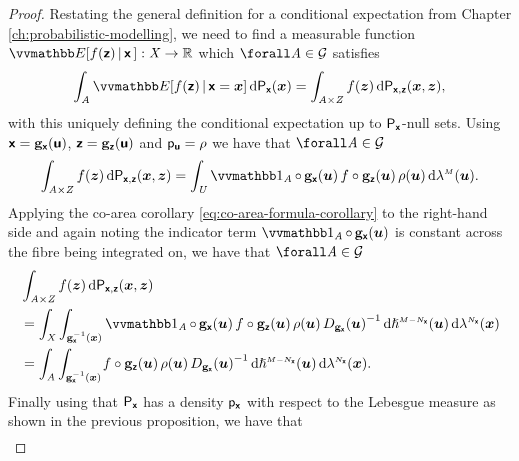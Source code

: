 \begin{proof}
Restating the general definition for a conditional expectation from Chapter \ref{ch:probabilistic-modelling}, we need to find a measurable function $\expc{f(\rvct{z}) \gvn \rvct{x}\,} : \set{X} \to \reals$ which $\forall\set{A} \in \sset{G}$ satisfies
\begin{equation*}
  \int_{\set{A}}
    \expc{f(\rvct{z}) \gvn \rvct{x} = \vct{x}} 
  \,\dr\prob{\rvct{x}}(\vct{x}) =
  \int_{\set{A} \times \set{Z}}
    f(\vct{z}) 
  \,\dr\prob{\rvct{x},\rvct{z}}(\vct{x},\vct{z}),
\end{equation*}
with this uniquely defining the conditional expectation up to $\mathsf{P}_{\boldsymbol{\mathsf{x}}}$-null sets. Using $\boldsymbol{\mathsf{x}} = {\mathbf{g}}_{\boldsymbol{\mathsf{x}}}(\boldsymbol{\mathsf{u}})$, $\boldsymbol{\mathsf{z}} = {\mathbf{g}}_{\boldsymbol{\mathsf{z}}}(\boldsymbol{\mathsf{u}})$ and $\mathsf{p}_{\boldsymbol{\mathsf{u}}} = \rho$ we have that $\forall\set{A} \in \sset{G}$
\begin{equation*}
  \int_{\set{A} \times \set{Z}}
    f(\vct{z}) 
  \,\dr\prob{\rvct{x},\rvct{z}}(\vct{x},\vct{z}) =
  \int_{\set{U}}
  \ind{\set{A}}\circ\,\genfunc_{\rvct{x}}(\vct{u})\,
  f\circ\genfunc_{\rvct{z}}(\vct{u})\,
  \rho(\vct{u})
  \,\dr\lebm{M}(\vct{u}).
\end{equation*}
Applying the co-area corollary \eqref{eq:co-area-formula-corollary} to the right-hand side and again noting the indicator term $\ind{\set{A}}\circ\,\genfunc_{\rvct{x}}(\vct{u})$ is constant across the fibre being integrated on, we have that $\forall \set{A} \in\sset{G}$
\begin{align*}
  &\int_{\set{A} \times \set{Z}}
    f(\vct{z}) 
  \,\dr\prob{\rvct{x},\rvct{z}}(\vct{x},\vct{z})\\
  &=
  \int_{\set{X}} \int_{\preimage{\genfunc_{\rvct{x}}}{\vct{x}}}
   \ind{\set{A}}\circ\,\genfunc_{\rvct{x}}(\vct{u})\,
   f\circ\genfunc_{\rvct{z}}(\vct{u})\,
   \rho(\vct{u})\,
   \jacobproddet{\genfunc_{\rvct{x}}}{\vct{u}}^{-1}
  \,\dr\haum{M-{N_{\rvct{x}}}}(\vct{u})
  \,\dr\lebm{N_{\rvct{x}}}(\vct{x})
  \\
  &=
  \int_{\set{A}}
  \int_{\preimage{\genfunc_{\rvct{x}}}{\vct{x}}}\kern-1pt
   f\circ\genfunc_{\rvct{z}}(\vct{u})\,
   \rho(\vct{u})\,
   \jacobproddet{\genfunc_{\rvct{x}}}{\vct{u}}^{-1}
  \,\dr\haum{M-{N_{\rvct{x}}}}(\vct{u})
  \,\dr\lebm{N_{\rvct{x}}}(\vct{x}).
\end{align*}
Finally using that $\mathsf{P}_{\boldsymbol{\mathsf{x}}}$ has a density $\mathsf{p}_{\boldsymbol{\mathsf{x}}}$ with respect to the Lebesgue measure as shown in the previous proposition, we have that
\begin{equation*}
\begin{split}

\end{split}
\end{equation*}
\end{proof}
